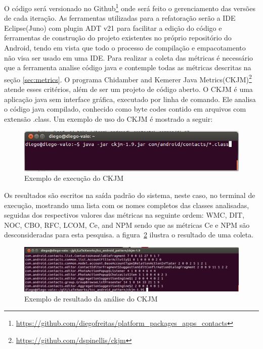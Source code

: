 \documentclass[conference]{IEEEtran}
\begin{document}
O código será versionado no
Github\footnote{\url{https://github.com/diegofreitas/platform_packages_apps_contacts}}
onde será feito o gerenciamento das versões de cada iteração.
As ferramentas utilizadas para a refatoração serão a IDE Eclipse(Juno) com
plugin ADT v21 para facilitar a edição do código e ferramentas de construção
do projeto existentes no próprio repositório do Android, tendo em vista que todo
o processo de compilação e empacotamento não visa ser usado em uma IDE.
Para realizar a coleta das métricas é necessário que a ferramenta analise código
java e contemple todas as métricas descritas na seção \ref{sec:metrics}. O
programa Chidamber and Kemerer Java
Metrics(CKJM)\footnote{\url{https://github.com/dspinellis/ckjm}} atende esses
critérios, além de ser um projeto de código aberto. O CKJM é uma aplicação java
sem interface gráfica, executado por linha de comando. Ele analisa o código java
compilado, conhecido como byte codes contido em arquivos com extensão .class. Um
exemplo de uso do CKJM é mostrado a seguir:

\begin{figure}[htb]
	\begin{center}
		\includegraphics[scale=0.25]{img/ckjm_run.png}
	\end{center}
	\caption{\label{fig:ckjm_run} Exemplo de execução do CKJM} 
	
\end{figure}

Os resultados são escritos na saída padrão do sistema, neste caso, no terminal
de execução, mostrando uma lista com os nomes completos das classes
analisadas, seguidas dos respectivos valores das métricas na seguinte
ordem: WMC, DIT, NOC, CBO, RFC, LCOM, Ce, and NPM sendo que as métricas Ce e
NPM são desconsideradas para esta pesquisa. a figura~\ref{fig:ckjm_result}
ilustra o resultado de uma coleta.

\begin{figure}[htb]
	\begin{center}
		\includegraphics[scale=0.25]{img/ckjm_result.png}
	\end{center}
	\caption{\label{fig:ckjm_result} Exemplo de resultado da análise do CKJM} 
	
\end{figure}
\end{document}
